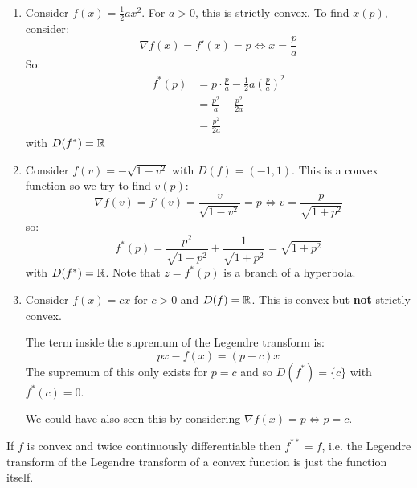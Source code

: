 \documentclass[../main.tex]{subfiles}
\begin{document}
\begin{example}
  \begin{enumerate}
    \item Consider $f(x) = \frac{1}{2}ax^2$.
      For $a > 0$, this is strictly convex.
      To find $x(p)$, consider:
      \[
        \nabla f(x) = f'(x) = p \iff x = \frac{p}{a}
      \]
      So:
      \begin{align*}
        f^{*}(p) &= p \cdot \frac{p}{a} - \frac{1}{2} a \left(\frac{p}{a}\right)^2 \\
                 &= \frac{p^2}{a} - \frac{p^2}{2a} \\
                 &= \frac{p^2}{2a}
      \end{align*}
      with $D(f^{*}) = \mathbb{R}$
    \item Consider $f(v) = - \sqrt{1 - v^2}$ with $D(f) = (-1, 1)$.
      This is a convex function so we try to find $v(p)$:
      \[
        \nabla f(v) = f'(v) = \frac{v}{\sqrt{1 - v^2}} = p \iff v = \frac{p}{\sqrt{1 + p^2}}
      \]
      so:
      \[
        f^{*}(p) = \frac{p^2}{\sqrt{1 + p^2}} + \frac{1}{\sqrt{1 + p^2}} = \sqrt{1 + p^2}
      \]
      with $D(f^{*}) = \mathbb{R}$.
      Note that $z = f^{*}(p)$ is a branch of a hyperbola.
    \item Consider $f(x) = cx$ for $c > 0$ and $D(f) = \mathbb{R}$.
      This is convex but \textbf{not} strictly convex.

      The term inside the supremum of the Legendre transform is:
      \[
        px - f(x) = (p - c)x
      \]
      The supremum of this only exists for $p = c$ and so $D(f^{*}) = \{c\}$ with $f^{*}(c) = 0$.

      We could have also seen this by considering $\nabla f(x) = p \iff p = c$.
  \end{enumerate}
\end{example}
\begin{theorem}
  If $f$ is convex and twice continuously differentiable then $f^{**} = f$, i.e. the Legendre transform of the Legendre transform of a convex function is just the function itself.
\end{theorem}
\end{document}
